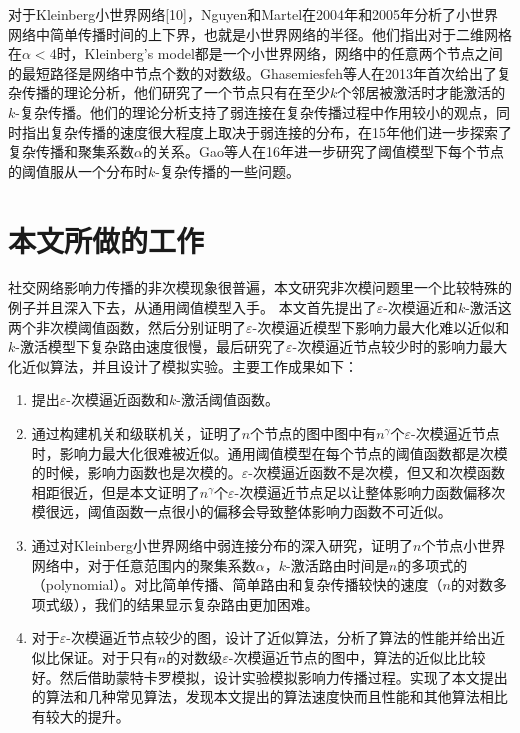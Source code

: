 对于Kleinberg小世界网络[10]，Nguyen和Martel在2004年\cite{Martel2004analyzing}和2005年\cite{Nguyen2005analyzing}分析了小世界网络中简单传播时间的上下界，也就是小世界网络的半径。他们指出对于二维网格在$\alpha<4$时，Kleinberg’s model都是一个小世界网络，网络中的任意两个节点之间的最短路径是网络中节点个数的对数级。Ghasemiesfeh等人\cite{Ghasemiesfeh2013complex}在2013年首次给出了复杂传播的理论分析，他们研究了一个节点只有在至少$k$个邻居被激活时才能激活的$k$-复杂传播。他们的理论分析支持了弱连接在复杂传播过程中作用较小的观点，同时指出复杂传播的速度很大程度上取决于弱连接的分布，在15年\cite{ebrahimi2015complex}他们进一步探索了复杂传播和聚集系数$\alpha$的关系。Gao等人在16年\cite{gao2016gt}进一步研究了阈值模型下每个节点的阈值服从一个分布时$k$-复杂传播的一些问题。




\section{本文所做的工作}
社交网络影响力传播的非次模现象很普遍，本文研究非次模问题里一个比较特殊的例子并且深入下去，从通用阈值模型入手。
本文首先提出了$\varepsilon$-次模逼近和$k$-激活这两个非次模阈值函数，然后分别证明了$\varepsilon$-次模逼近模型下影响力最大化难以近似和$k$-激活模型下复杂路由速度很慢，最后研究了$\varepsilon$-次模逼近节点较少时的影响力最大化近似算法，并且设计了模拟实验。主要工作成果如下：


\begin{enumerate}
\item  提出$\varepsilon$-次模逼近函数和$k$-激活阈值函数。
\item  通过构建机关和级联机关，证明了$n$个节点的图中图中有$n^{\gamma}$个$\varepsilon$-次模逼近节点时，影响力最大化很难被近似。通用阈值模型在每个节点的阈值函数都是次模的时候，影响力函数也是次模的\cite{Mossel2007sub}。$\varepsilon$-次模逼近函数不是次模，但又和次模函数相距很近，但是本文证明了$n^{\gamma}$个$\varepsilon$-次模逼近节点足以让整体影响力函数偏移次模很远，阈值函数一点很小的偏移会导致整体影响力函数不可近似。
\item  通过对Kleinberg小世界网络中弱连接分布的深入研究，证明了$n$个节点小世界网络中，对于任意范围内的聚集系数$\alpha$，$k$-激活路由时间是$n$的多项式的（polynomial）。对比简单传播、简单路由和复杂传播较快的速度（$n$的对数多项式级），我们的结果显示复杂路由更加困难。
\item  对于$\varepsilon$-次模逼近节点较少的图，设计了近似算法，分析了算法的性能并给出近似比保证。对于只有$n$的对数级$\varepsilon$-次模逼近节点的图中，算法的近似比比较好。然后借助蒙特卡罗模拟，设计实验模拟影响力传播过程。实现了本文提出的算法和几种常见算法，发现本文提出的算法速度快而且性能和其他算法相比有较大的提升。
\end{enumerate}

